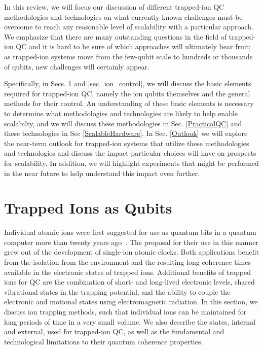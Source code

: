 \documentclass[%
12pt,
 amsmath,amssymb,
]{revtex4-2}
\begin{document}
In this review, we will focus our discussion of different trapped-ion QC methodologies and technologies on what currently known challenges must be overcome to reach any reasonable level of scalability with a particular approach. We emphasize that there are many outstanding questions in the field of trapped-ion QC and it is hard to be sure of which approaches will ultimately bear fruit; as trapped-ion systems move from the few-qubit scale to hundreds or thousands of qubits, new challenges will certainly appear.

Specifically, in Secs. \ref{sec_trapped_ion_qubits} and \ref{sec_ion_control}, we will discuss the basic elements required for trapped-ion QC, namely the ion qubits themselves and the general methods for their control. An understanding of these basic elements is necessary to determine what methodologies and technologies are likely to help enable scalabilty, and we will discuss these methodologies in Sec. \ref{PracticalQC} and these technologies in Sec \ref{ScalableHardware}.  In Sec. \ref{Outlook} we will explore the near-term outlook for trapped-ion systems that utilize these methodologies and technologies and discuss the impact particular choices will have on prospects for scalability.  In addition, we will highlight experiments that might be performed in the near future to help understand this impact even further.


\section{Trapped Ions as Qubits}
\label{sec_trapped_ion_qubits}

Individual atomic ions were first suggested for use as quantum bits in a quantum computer more than twenty years ago~\cite{CiracZollerGate}.  The proposal for their use in this manner grew out of the development of single-ion atomic clocks.  Both applications benefit from the isolation from the environment and the resulting long coherence times available in the electronic states of trapped ions.  Additional benefits of trapped ions for QC are the combination of short- and long-lived electronic levels, shared vibrational states in the trapping potential, and the ability to couple the electronic and motional states using electromagnetic radiation.  In this section, we discuss ion trapping methods, such that individual ions can be maintained for long periods of time in a very small volume.  We also describe the states, internal and external, used for trapped-ion QC, as well as the fundamental and technological limitations to their quantum coherence properties.
\end{document}
